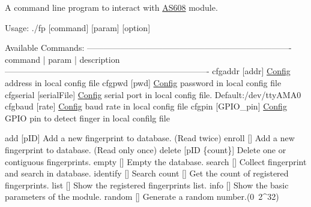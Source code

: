 \begin{DoxyCode}
A command line program to interact with \hyperlink{struct_a_s608___module___info}{AS608} module.

Usage:
  ./fp [command] [param] [option]

Available Commands:
-------------------------------------------------------------------------
  command  | param     | description
-------------------------------------------------------------------------
  cfgaddr   [addr]     \hyperlink{struct___config}{Config} address in local config file
  cfgpwd    [pwd]      \hyperlink{struct___config}{Config} password in local config file
  cfgserial [serialFile] \hyperlink{struct___config}{Config} serial port in local config file. Default:/dev/ttyAMA0
  cfgbaud   [rate]     \hyperlink{struct___config}{Config} baud rate in local config file
  cfgpin    [GPIO\_pin] \hyperlink{struct___config}{Config} GPIO pin to detect finger in local confilg file

  add       [pID]      Add a \textcolor{keyword}{new} fingerprint to database. (Read twice) 
  enroll    []         Add a \textcolor{keyword}{new} fingerprint to database. (Read only once)
  \textcolor{keyword}{delete}    [pID \{count\}]  Delete one or contiguous fingerprints.
  empty     []         Empty the database.
  search    []         Collect fingerprint and search in database.
  identify  []         Search
  count     []         Get the count of registered fingerprints.
  list      []         Show the registered fingerprints list.
  info      []         Show the basic parameters of the module.
  random    []         Generate a random number.(0~2^32)


\end{DoxyCode}
